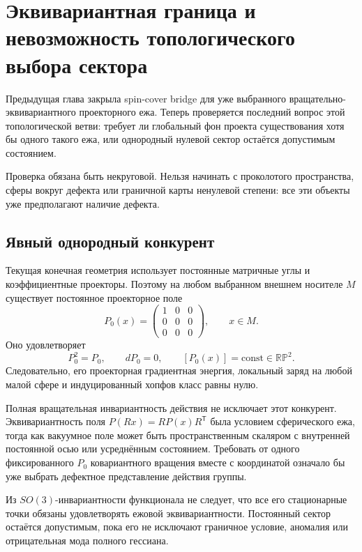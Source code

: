 \chapter{Эквивариантная граница и невозможность топологического выбора сектора}

Предыдущая глава закрыла spin-cover bridge для уже выбранного
вращательно-эквивариантного проекторного ежа. Теперь проверяется последний
вопрос этой топологической ветви: требует ли глобальный фон проекта
существования хотя бы одного такого ежа, или однородный нулевой сектор
остаётся допустимым состоянием.

Проверка обязана быть некруговой. Нельзя начинать с проколотого пространства,
сферы вокруг дефекта или граничной карты ненулевой степени: все эти объекты
уже предполагают наличие дефекта.

\section{Явный однородный конкурент}

Текущая конечная геометрия использует постоянные матричные углы и
коэффициентные проекторы. Поэтому на любом выбранном внешнем носителе $M$
существует постоянное проекторное поле
\begin{equation}
 P_0(x)=
 \begin{pmatrix}
 1&0&0\\0&0&0\\0&0&0
 \end{pmatrix},
 \qquad x\in M.
 \label{eq:v5-sector-selection-constant-projector}
\end{equation}
Оно удовлетворяет
\begin{equation}
 P_0^2=P_0,
 \qquad
 dP_0=0,
 \qquad
 [P_0(x)]=\text{const}\in\mathbb{RP}^2.
\end{equation}
Следовательно, его проекторная градиентная энергия, локальный заряд на любой
малой сфере и индуцированный хопфов класс равны нулю.

Полная вращательная инвариантность действия не исключает этот конкурент.
Эквивариантность поля $P(Rx)=RP(x)R^{\mathsf T}$ была условием
сферического ежа, тогда как вакуумное поле может быть пространственным
скаляром с внутренней постоянной осью или усреднённым состоянием. Требовать
от одного фиксированного $P_0$ ковариантного вращения вместе с координатой
означало бы уже выбрать дефектное представление действия группы.

\begin{nogocriterion}
Из $SO(3)$-инвариантности функционала не следует, что все его стационарные
точки обязаны удовлетворять ежовой эквивариантности. Постоянный сектор
остаётся допустимым, пока его не исключают граничное условие, аномалия или
отрицательная мода полного гессиана.
\end{nogocriterion}

